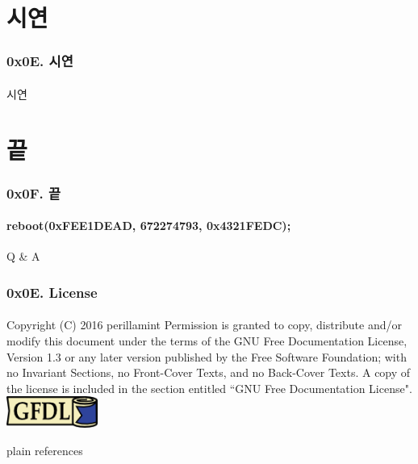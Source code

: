 \section[Section]{시연}
\begin{frame}
  \frametitle{0x0E. 시연}
  \framesubtitle{}

  \begin{center}
  시연
  \end{center}
\end{frame}

\section[Section]{끝}
\begin{frame}
  \frametitle{0x0F. 끝}
  \framesubtitle{reboot(0xFEE1DEAD, 672274793, 0x4321FEDC);}

  \begin{center}
    Q \& A
  \end{center}
\end{frame}

\begin{frame}
  \frametitle{0x0E. License}
  \framesubtitle{}
  Copyright (C)  2016 perillamint\linebreak
  Permission is granted to copy, distribute and/or modify this document
  under the terms of the GNU Free Documentation License, Version 1.3
  or any later version published by the Free Software Foundation;\linebreak
  with no Invariant Sections, no Front-Cover Texts, and no Back-Cover Texts.
  A copy of the license is included in the section entitled ``GNU
  Free Documentation License".
  \linebreak
  \linebreak
  \linebreak
  \linebreak
  \includegraphics [width=30mm]{img/gfdl-logo-small.png}
\end{frame}

 {plain}
 {references}


